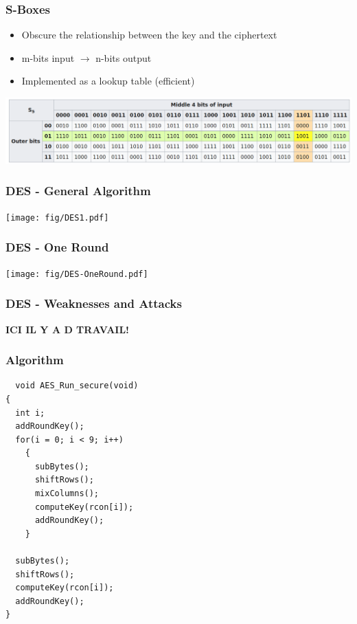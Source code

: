 \documentclass[
hyperref={pdfpagelabels=false}
,xcolor=table
]
{beamer}
\newcommand{\travail}{\textbf{ICI IL Y A D TRAVAIL!}}
\begin{document}
\begin{frame}
  \frametitle{S-Boxes}

  \begin{itemize}
  \item Obscure the relationship between the key and the ciphertext
  \item m-bits input $\longrightarrow$ n-bits output
  \item Implemented as a lookup table (efficient)
  \end{itemize}

  \begin{center}
    \includegraphics[width=\textwidth,keepaspectratio]{fig/example-Sbox.png}
  \end{center} 
 
\end{frame}


\begin{frame}
  \frametitle{DES - General Algorithm}
  \begin{center}
    \texttt{[image: fig/DES1.pdf]}
  \end{center} 
  
\end{frame}

\begin{frame}
  \frametitle{DES - One Round}
  \begin{center}
    \texttt{[image: fig/DES-OneRound.pdf]}
  \end{center} 

\end{frame}


\begin{frame}
  \frametitle{DES - Weaknesses and Attacks}

  \travail
  
\end{frame}




\begin{frame}[fragile]
  \frametitle{Algorithm}
\begin{verbatim}
  void AES_Run_secure(void)
{
  int i;
  addRoundKey();
  for(i = 0; i < 9; i++)
	{
      subBytes();
	  shiftRows();
	  mixColumns();
	  computeKey(rcon[i]);
	  addRoundKey();
	}

  subBytes();
  shiftRows();
  computeKey(rcon[i]);
  addRoundKey();
}
\end{verbatim}
\end{frame}
\end{document}
